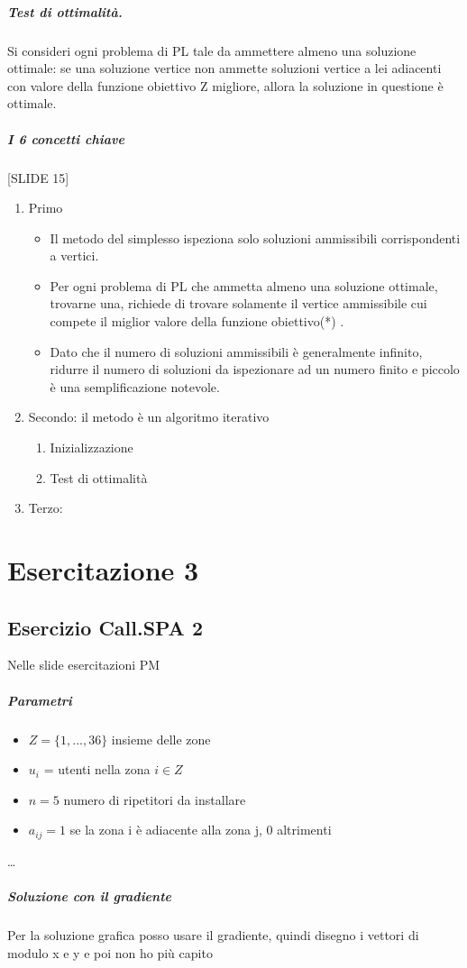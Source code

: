 \documentclass[12pt, a4paper, openany]{book}
\begin{document}
\paragraph*{Test di ottimalità.} Si consideri ogni problema di PL tale da ammettere almeno una soluzione ottimale: se una soluzione vertice non ammette soluzioni vertice a lei adiacenti con valore della funzione obiettivo Z migliore, allora la soluzione in questione è ottimale.
\paragraph*{I 6 concetti chiave} [SLIDE 15]
\begin{enumerate}
    \item Primo
        \begin{itemize}
            \item Il metodo del simplesso ispeziona solo
            soluzioni ammissibili corrispondenti a
            vertici.
            \item Per ogni problema di PL che ammetta
            almeno una soluzione ottimale, trovarne
            una, richiede di trovare solamente il vertice
            ammissibile cui compete il miglior valore
            della funzione obiettivo(*)
            .
            \item Dato che il numero di soluzioni ammissibili
            è generalmente infinito, ridurre il numero
            di soluzioni da ispezionare ad un numero
            finito e piccolo è una semplificazione
            notevole.
        \end{itemize}
    \item Secondo: il metodo è un algoritmo iterativo
    \begin{enumerate}
        \item Inizializzazione
        \item Test di ottimalità
    \end{enumerate}
    \item Terzo: 
\end{enumerate}
 

\chapter*{Esercitazione 3}
\section*{Esercizio Call.SPA 2} Nelle slide esercitazioni PM
\paragraph*{Parametri}
\begin{itemize}
    \item $Z = \{ 1,...,36\}$ insieme delle zone
    \item $u_i$ = utenti nella zona $i \in Z$
    \item $n=5$ numero di ripetitori da installare
    \item $a_{ij} = 1$ se la zona i è adiacente alla zona j, 0 altrimenti
\end{itemize}
\dots
\paragraph*{Soluzione con il gradiente}
Per la soluzione grafica posso usare il gradiente, quindi disegno i vettori di modulo x e y e poi non ho più capito
\end{document}
